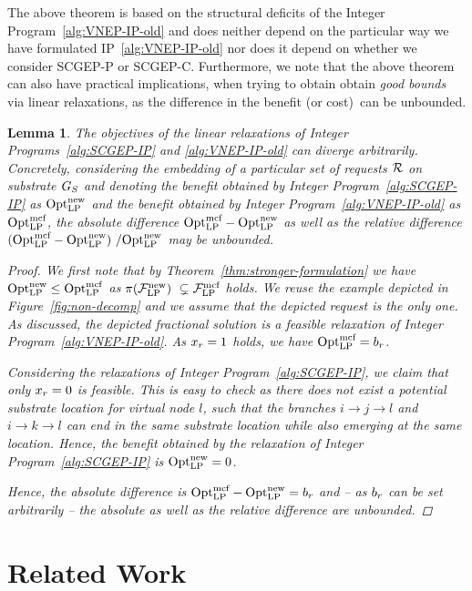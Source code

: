 \documentclass[10pt, conference, letterpaper]{IEEEtran}
\newtheorem{lemma}[theorem]{Lemma}
\begin{document}
The above theorem is based on the structural deficits of the Integer Program~\ref{alg:VNEP-IP-old} and does neither depend on the particular way we have formulated IP~\ref{alg:VNEP-IP-old} nor does it depend on whether we consider SCGEP-P or SCGEP-C. Furthermore, we note that the above theorem can also have practical implications, when trying to obtain obtain \emph{good bounds} via linear relaxations, as the difference in the benefit (or cost)~can be unbounded.

\begin{lemma}
The objectives of the linear relaxations of Integer Programs~\ref{alg:SCGEP-IP} and \ref{alg:VNEP-IP-old} can diverge arbitrarily. Concretely, considering the embedding of a particular set of requests $\mathcal{R}$ on substrate $G_S$ and denoting the benefit obtained by Integer Program~\ref{alg:SCGEP-IP} as $\textnormal{Opt}^{\textnormal{new}}_{\textnormal{LP}}$ and the benefit obtained by Integer Program~\ref{alg:VNEP-IP-old} as $\textnormal{Opt}^{\textnormal{mcf}}_{\textnormal{LP}}$, the absolute difference $\textnormal{Opt}^{\textnormal{mcf}}_{\textnormal{LP}} - \textnormal{Opt}^{\textnormal{new}}_{\textnormal{LP}}$ as well as the relative difference $(\textnormal{Opt}^{\textnormal{mcf}}_{\textnormal{LP}} - \textnormal{Opt}^{\textnormal{new}}_{\textnormal{LP}})~/ \textnormal{Opt}^{\textnormal{new}}_{\textnormal{LP}}$ may be unbounded. 
\begin{proof}
We first note that by Theorem~\ref{thm:stronger-formulation} we have $\textnormal{Opt}^{\textnormal{new}}_{\textnormal{LP}} \leq \textnormal{Opt}^{\textnormal{mcf}}_{\textnormal{LP}}$ as $\pi(\mathcal{F}^{\textnormal{new}}_{\textnormal{LP}})~\subsetneq \mathcal{F}^{\textnormal{mcf}}_{\textnormal{LP}}$ holds. We reuse the example depicted in Figure~\ref{fig:non-decomp} and we assume that the depicted request is the only one. As discussed, the depicted fractional solution is a feasible relaxation of Integer Program~\ref{alg:VNEP-IP-old}. As $x_{r} = 1$ holds, we have $\textnormal{Opt}^{\textnormal{mcf}}_{\textnormal{LP}} = b_{r}$.  

Considering the relaxations of Integer Program~\ref{alg:SCGEP-IP}, we claim that only $x_{r} = 0$ is feasible. This is easy to check as there does not exist a potential substrate location for virtual node $l$, such that the branches $i \rightarrow j \rightarrow l$ and $i \rightarrow k \rightarrow l$ can end in the same substrate location while also emerging at the same location. Hence, the benefit obtained by the relaxation of Integer Program~\ref{alg:SCGEP-IP} is $\textnormal{Opt}^{\textnormal{new}}_{\textnormal{LP}} = 0$.

Hence, the absolute difference is $\textnormal{Opt}^{\textnormal{mcf}}_{\textnormal{LP}} - \textnormal{Opt}^{\textnormal{new}}_{\textnormal{LP}} = b_{r}$ and -- as $b_{r}$ can be set arbitrarily -- the absolute as well as the relative difference are unbounded.
\end{proof}
\end{lemma}



\section{Related Work}\label{sec:relwork}
\end{document}
